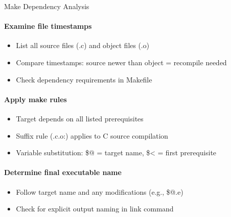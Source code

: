 \begin{KR}{Make Dependency Analysis}
    \paragraph{Examine file timestamps}
    \begin{itemize}
        \item List all source files (.c) and object files (.o)
        \item Compare timestamps: source newer than object = recompile needed
        \item Check dependency requirements in Makefile
    \end{itemize}
    
    \paragraph{Apply make rules}
    \begin{itemize}
        \item Target depends on all listed prerequisites
        \item Suffix rule (.c.o:) applies to C source compilation
        \item Variable substitution: \$@ = target name, \$< = first prerequisite
    \end{itemize}
    
    \paragraph{Determine final executable name}
    \begin{itemize}
        \item Follow target name and any modifications (e.g., \$@.e)
        \item Check for explicit output naming in link command
    \end{itemize}
\end{KR}

